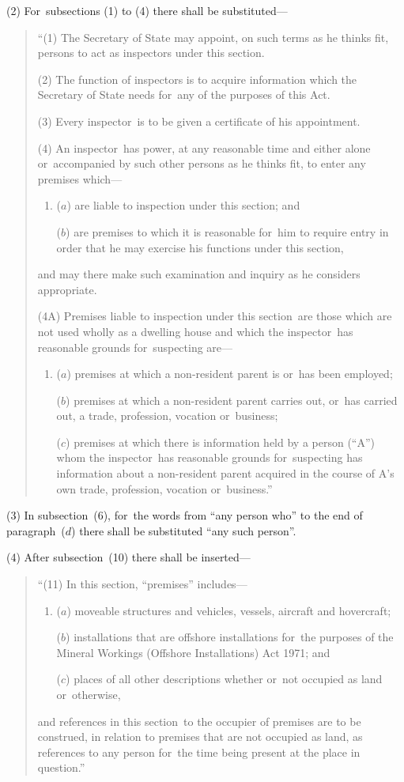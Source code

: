 \documentclass[12pt,a4paper]{article}
\begin{document}
(2) For~subsections (1)  to (4) there shall be substituted—
\begin{quotation}
“(1) The Secretary of State may appoint, on such terms as he thinks fit, persons to act as inspectors under this section.

(2) The function of inspectors is to acquire information which the Secretary of State needs for~any of the purposes of this Act.

(3) Every inspector~is to be given a certificate of his appointment.

(4) An inspector~has power, at any reasonable time and either alone or~accompanied by such other persons as he thinks fit, to enter any premises which—
\begin{enumerate}\item[]
($a$) are liable to inspection under this section; and

($b$) are premises to which it is reasonable for~him to require entry in order that he may exercise his functions under this section,
\end{enumerate}
and may there make such examination and inquiry as he considers appropriate.

(4A) Premises liable to inspection under this section~are those which are not used wholly as a dwelling house and which the inspector~has reasonable grounds for~suspecting are—
\begin{enumerate}\item[]
($a$) premises at which a non-resident parent is or~has been employed;

($b$) premises at which a non-resident parent carries out, or~has carried out, a trade, profession, vocation or~business;

($c$) premises at which there is information held by a person (“A”) whom the inspector~has reasonable grounds for~suspecting has information about a non-resident parent acquired in the course of A’s own trade, profession, vocation or~business.”
\end{enumerate}
\end{quotation}

(3) In subsection~(6), for~the words from “any person who” to the end of paragraph~($d$)  there shall be substituted “any such person”.

(4) After subsection~(10)  there shall be inserted—
\begin{quotation}
“(11) In this section, “premises” includes—
\begin{enumerate}\item[]
($a$) moveable structures and vehicles, vessels, aircraft and hovercraft;

($b$) installations that are offshore installations for~the purposes of the Mineral Workings (Offshore Installations) Act 1971; and

($c$) places of all other descriptions whether or~not occupied as land or~otherwise,
\end{enumerate}
and references in this section~to the occupier of premises are to be construed, in relation to premises that are not occupied as land, as references to any person for~the time being present at the place in question.”
\end{quotation}
\end{document}
